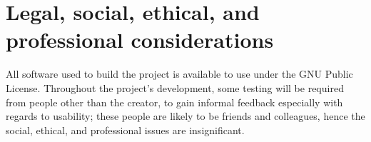 \documentclass[10pt,a4paper]{article}
\begin{document}
\section*{Legal, social, ethical, and professional  considerations}
All software used to build the project is available to use under the GNU Public
License. Throughout the project's development, some testing will be required
from people other than the creator, to gain informal feedback especially with
regards to usability; these people are likely to be friends and colleagues,
hence the social, ethical, and professional issues are insignificant.


\end{document}
